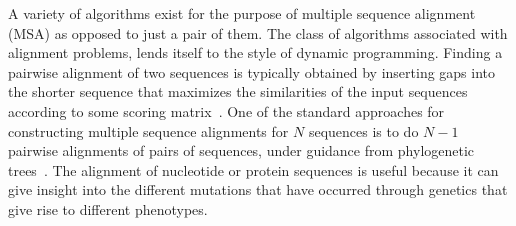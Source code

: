 A variety of algorithms exist for the purpose of multiple sequence alignment (MSA) as opposed to just a pair of them. The class of algorithms associated with alignment problems, lends itself to the style of dynamic programming. Finding a pairwise alignment of two sequences is typically obtained by inserting gaps into the shorter sequence that maximizes the similarities of the input sequences according to some scoring matrix~\cite{edgar2006multiple}. One of the standard approaches for constructing multiple sequence alignments for $N$ sequences is to do $N-1$ pairwise alignments of pairs of sequences, under guidance from phylogenetic trees~\cite{feng1987progressive}.
	The alignment of nucleotide or protein sequences is useful because it can give insight into the different mutations that have occurred through genetics that give rise to different phenotypes. 
